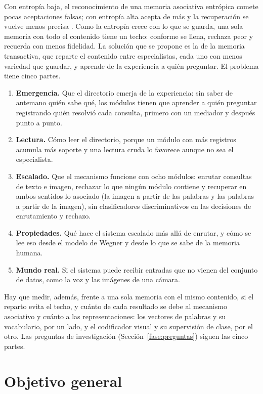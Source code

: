 Con entropía baja, el reconocimiento de una memoria asociativa entrópica comete pocas
aceptaciones falsas; con entropía alta acepta de más y la recuperación se vuelve menos
precisa \cite{pineda2021entropic,morales2022manuscript}.
Como la entropía crece con lo que se guarda, una sola memoria con todo el contenido tiene
un techo: conforme se llena, rechaza peor y recuerda con menos fidelidad.
La solución que se propone es la de la memoria transactiva, que reparte el contenido
entre especialistas, cada uno con menos variedad que guardar, y aprende de la experiencia
a quién preguntar.
El problema tiene cinco partes.
\begin{enumerate}
    \item \textbf{Emergencia.} Que el directorio emerja de la experiencia: sin saber de antemano
    quién sabe qué, los módulos tienen que aprender a quién preguntar registrando quién
    resolvió cada consulta, primero con un mediador y después punto a punto.
    \item \textbf{Lectura.} Cómo leer el directorio, porque un módulo con más registros
    acumula más soporte y una lectura cruda lo favorece aunque no sea el especialista.
    \item \textbf{Escalado.} Que el mecanismo funcione con ocho módulos: enrutar consultas
    de texto e imagen, rechazar lo que ningún módulo contiene y recuperar en ambos
    sentidos lo asociado (la imagen a partir de las palabras y las palabras a partir de la
    imagen), sin clasificadores discriminativos en las decisiones de enrutamiento y
    rechazo.
    \item \textbf{Propiedades.} Qué hace el sistema escalado más allá de enrutar, y cómo
    se lee eso desde el modelo de Wegner y desde lo que se sabe de la memoria humana.
    \item \textbf{Mundo real.} Si el sistema puede recibir entradas que no vienen del
    conjunto de datos, como la voz y las imágenes de una cámara.
\end{enumerate}

Hay que medir, además, frente a una sola memoria con el mismo contenido, si el reparto evita el
techo, y cuánto de cada resultado se debe al mecanismo asociativo y cuánto a las
representaciones: los vectores de palabras y su vocabulario, por un lado,
y el codificador visual y su supervisión de clase, por el otro.
Las preguntas de investigación (Sección~\ref{fase:preguntas}) siguen las cinco partes.

\section{Objetivo general}\label{secc:og}

